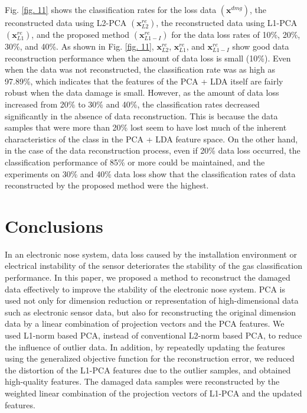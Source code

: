 \documentclass[10pt,letterpaper]{article}
\begin{document}
Fig. \ref{fig. 11} shows the classification rates for the loss data $(\textbf{x}^{dmg})$, the reconstructed data using L2-PCA $(\textbf{x}^{re}_{L2})$, the reconstructed data using L1-PCA $(\textbf{x}^{re}_{L1})$, and the proposed method $(\textbf{x}^{re}_{L1-I})$ for the data loss rates of 10\%, 20\%, 30\%, and 40\%. 
As shown in Fig. \ref{fig. 11}, $\textbf{x}^{re}_{L2}$, $\textbf{x}^{re}_{L1}$, and $\textbf{x}^{re}_{L1-I}$ show good data reconstruction performance when the amount of data loss is small (10\%). 
Even when the data was not reconstructed, the classification rate was as high as 97.89\%, which indicates that the features of the PCA + LDA itself are fairly robust when the data damage is small. 
However, as the amount of data loss increased from 20\% to 30\% and 40\%, the classification rates decreased significantly in the absence of data reconstruction. 
This is because the data samples that were more than 20\% lost seem to have lost much of the inherent characteristics of the class in the PCA + LDA feature space. 
On the other hand, in the case of the data reconstruction process, even if 20\% data loss occurred, the classification performance of 85\% or more could be maintained, and the experiments on 30\% and 40\% data loss show that the classification rates of data reconstructed by the proposed method were the highest.

\section*{Conclusions}
In an electronic nose system, data loss caused by the installation environment or electrical instability of the sensor deteriorates the stability of the gas classification performance. In this paper, we proposed a method to reconstruct the damaged data effectively to improve the stability of the electronic nose system. PCA is used not only for dimension reduction or representation of high-dimensional data such as electronic sensor data, but also for reconstructing the original dimension data by a linear combination of projection vectors and the PCA features. 
We used L1-norm based PCA, instead of conventional L2-norm based PCA, to reduce the influence of outlier data. 
In addition, by repeatedly updating the features using the generalized objective function for the reconstruction error, we reduced the distortion of the L1-PCA features due to the outlier samples, and obtained high-quality features. 
The damaged data samples were reconstructed by the weighted linear combination of the projection vectors of L1-PCA and the updated features.  
\end{document}
